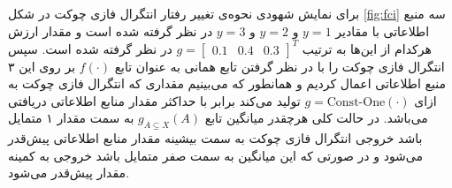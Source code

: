  برای نمایش شهودی نحوه‌ی تغییر رفتار انتگرال فازی چوکت در شکل
\ref{fig:fci}
سه منبع اطلاعاتی با مقادیر $y = 1$ و $y = 2$ و $y = 3$ در نظر گرفته شده است و مقدار ارزش هرکدام از این‌ها به ترتیب $g = \begin{bmatrix}0.1 & 0.4& 0.3\end{bmatrix}^T$ در نظر گرفته شده است. سپس انتگرال فازی چوکت را با در نظر گرفتن تابع همانی به عنوان تابع $f(\cdot)$ بر روی این ۳ منبع اطلاعاتی اعمال کردیم و همانطور که می‌بینیم مقداری که انتگرال فازی چوکت به ازای $g = \text{Const-One}(\cdot)$ تولید می‌کند برابر با حداکثر مقدار منابع اطلاعاتی دریافتی می‌باشد. در حالت کلی هرچقدر میانگین تابع $g_{A \subseteq X}(A)$ به سمت مقدار ۱ متمایل باشد خروجی انتگرال فازی چوکت به سمت بیشینه مقدار منابع اطلاعاتی پیش‌قدر می‌شود و در صورتی که این میانگین به سمت صفر متمایل باشد خروجی به کمینه مقدار پیش‌قدر می‌شود.

